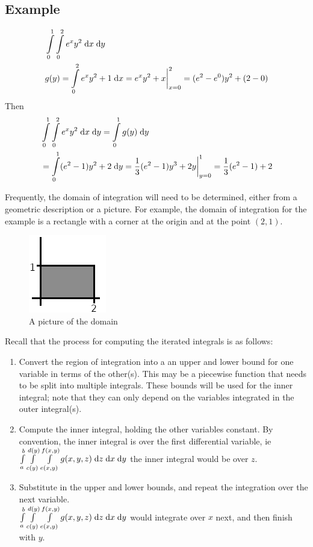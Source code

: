\documentclass[letterpaper,11pt]{article}
\begin{document}
  \subsection*{Example}
  \begin{align*}
    & \int \limits_{0}^{1} \int \limits_{0}^{2} e^{x} y^2 \;\mathrm{d}x \;\mathrm{d}y\\
    & g(y) = \int \limits_{0}^{2} e^{x} y^2 + 1 \;\mathrm{d}x = e^x y^2 + x \bigg \rvert_{x = 0}^{2} = (e^{2} - e^{0}) y^2 + (2 - 0)
  \end{align*}
  Then
  \begin{align*}
    & \int \limits_{0}^{1} \int \limits_{0}^{2} e^{x} y^2 \;\mathrm{d}x \;\mathrm{d}y = \int \limits_{0}^{1} g(y) \;\mathrm{d}y\\
    & = \int \limits_{0}^{1} (e^{2} - 1) y^2 + 2 \;\mathrm{d}y
      = \frac{1}{3} (e^{2} - 1) y^3 + 2 y \bigg \rvert_{y = 0}^{1}
      = \frac{1}{3} (e^{2} - 1) + 2
  \end{align*}

  Frequently, the domain of integration will need to be determined, either from a geometric description or a picture.
  For example, the domain of integration for the example is a rectangle with a corner at the origin and at the point $(2, 1)$.
  \begin{figure}[h]
    \centering \includegraphics{mech222/lecture_1a_example_domain.png}
    \caption{A picture of the domain}
  \end{figure}
  Recall that the process for computing the iterated integrals is as follows:
  \begin{enumerate}
    \item Convert the region of integration into a an upper and lower bound for one variable in terms of the other(s).
      This may be a piecewise function that needs to be split into multiple integrals.
      These bounds will be used for the inner integral; note that they can only depend on the variables integrated in the outer integral(s).
    \item Compute the inner integral, holding the other variables constant.
      By convention, the inner integral is over the first differential variable, ie
      $\int \limits_{a}^{b} \int \limits_{c(y)}^{d(y)} \int \limits_{e(x, y)}^{f(x, y)} g(x, y, z) \;\mathrm{d}z \;\mathrm{d}x \;\mathrm{d}y$
      the inner integral would be over $z$.
    \item Substitute in the upper and lower bounds, and repeat the integration over the next variable.\\
      $\int \limits_{a}^{b} \int \limits_{c(y)}^{d(y)} \int \limits_{e(x, y)}^{f(x, y)} g(x, y, z) \;\mathrm{d}z \;\mathrm{d}x \;\mathrm{d}y$
      would integrate over $x$ next, and then finish with $y$.
  \end{enumerate}
\end{document}
